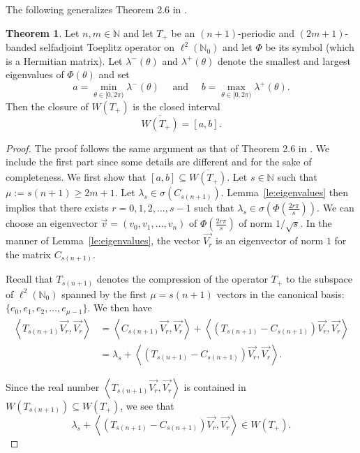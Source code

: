 \documentclass[12pt,reqno]{amsart}
\theoremstyle{definition}
\newtheorem{theorem}{Theorem}[section]
\newcommand{\ovl}[1]{\overline{#1}}	%
\newcommand{\Vr}{\overrightarrow{V_r}}
\newcommand{\N}{{\mathbb{N}}}
\begin{document}
The following generalizes Theorem 2.6 in \cite{IM}.

\begin{theorem}\label{th:selfadjoint}
Let $n, m \in {\mathbb N}$ and let $T_+$ be an $(n+1)$-periodic and $(2m+1)$-banded selfadjoint Toeplitz operator on $\ell^2(\N_0)$ and let $\Phi$ be its symbol (which is a Hermitian matrix). Let $\lambda^-(\theta)$ and $\lambda^+(\theta)$ denote the 
smallest and largest eigenvalues of $\Phi(\theta)$ and set
\[
a=\min_{\theta\in[0,2\pi)}\lambda^-(\theta) \quad \text{ and } \quad b=\max_{\theta\in[0,2\pi)}\lambda^+(\theta).
\]
Then the closure of $W(T_+)$ is the closed interval
\[
\ovl{W(T_+)}=[a,b].
\]
\end{theorem}
\begin{proof}
The proof follows the same argument as that of Theorem 2.6 in \cite{IM}. We include the first part since some details are different and for the sake of completeness. 
We first show that $[a,b] \subseteq \overline{W(T_+)}$. Let $s\in {\mathbb N}$ such that $\mu:=s(n+1)\geq 2m+1$. Let $\lambda_s \in \sigma(C_{s(n+1)})$. 
 Lemma~\ref{le:eigenvalues} then implies that there exists $r=0, 1, 2, \dots, s-1$ such that  $\lambda_{s} \in \sigma\left(\Phi(\frac{2 r \pi}{s})\right)$. We can choose an eigenvector 
$\vec{v}=(v_0,v_1,\ldots,v_n)$ of $\Phi(\frac{2 r \pi}{s})$ of norm $1/\sqrt{s}$. In the manner of Lemma~\ref{le:eigenvalues}, the vector $\Vr$ is an eigenvector of norm $1$ for the matrix $C_{s(n+1)}$.

Recall that $T_{s(n+1)}$ denotes the compression of the operator $T_+$ to the subspace of $\ell^2(\N_0)$ spanned by the first $\mu=s(n+1)$ vectors in the canonical basis: $\{ e_0, e_1, e_2, \dots, e_{\mu-1}\}$. We then have
\begin{align*}
    \left\langle  T_{s(n+1)} \Vr, \Vr \right\rangle &=
    \left\langle  C_{s(n+1)} \Vr, \Vr \right\rangle 
    + \left\langle \left(T_{s(n+1)}-C_{s(n+1)}\right) \Vr, \Vr \right\rangle \\
    &= \lambda_{s} + \left\langle \left(T_{s(n+1)}-C_{s(n+1)}\right) \Vr, \Vr \right\rangle.
\end{align*}

Since the real number $\left\langle  T_{s(n+1)} \Vr, \Vr  \right\rangle$ is contained in $W(T_{s(n+1)}) \subseteq W(T_+)$, we see that
\begin{equation}\label{eq:lpTmCinW}
\lambda_{s} + \left\langle \left(T_{s(n+1)}-C_{s(n+1)}\right)\Vr, \Vr \right\rangle  \in W(T_+).
\end{equation}


\end{proof}
\end{document}
